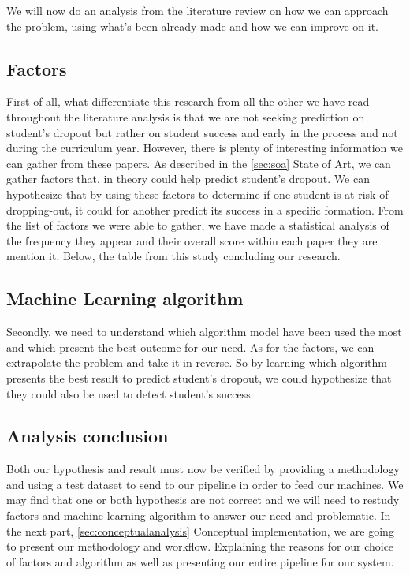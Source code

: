 \documentclass[../main.tex]{subfiles}
\begin{document}
We will now do an analysis from the literature review on how we can approach the problem, using what's been already made and how we can improve on it.

\subsection{Factors}
\label{subsec:analysis_factors}
First of all, what differentiate this research from all the other we have read throughout the literature analysis is that we are not seeking prediction on student's dropout but rather on student success and early in the process and not during the curriculum year. However, there is plenty of interesting information we can gather from these papers. As described in the \ref{sec:soa} State of Art, we can gather factors that, in theory could help predict student's dropout. We can hypothesize that by using these factors to determine if one student is at risk of dropping-out, it could for another predict its success in a specific formation. From the list of factors we were able to gather, we have made a statistical analysis of the frequency they appear and their overall score within each paper they are mention it. Below, the table from this study concluding our research.

\subsection{Machine Learning algorithm}
\label{subsec:analysis_mlalgo}
Secondly, we need to understand which algorithm model have been used the most and which present the best outcome for our need. As for the factors, we can extrapolate the problem and take it in reverse. So by learning which algorithm presents the best result to predict student's dropout, we could hypothesize that they could also be used to detect student's success. 

\subsection{Analysis conclusion}
\label{subsec:analysis_conclusion}
Both our hypothesis and result must now be verified by providing a methodology and using a test dataset to send to our pipeline in order to feed our machines.
We may find that one or both hypothesis are not correct and we will need to restudy factors and machine learning algorithm to answer our need and problematic. 
In the next part, \ref{sec:conceptualanalysis} Conceptual implementation, we are going to present our methodology and workflow. Explaining the reasons for our choice of factors and algorithm as well as presenting our entire pipeline for our system.
\end{document}
